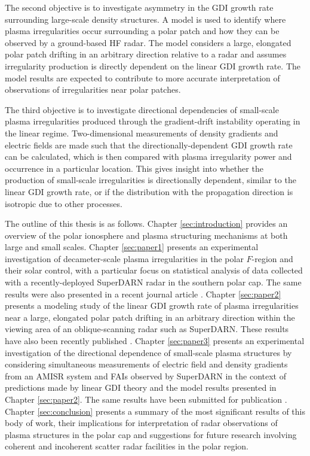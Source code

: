 The second objective is to investigate asymmetry in the GDI growth rate surrounding large-scale density structures.  A model is used to identify where plasma irregularities occur surrounding a polar patch and how they can be observed by a ground-based HF radar.  The model considers a large, elongated polar patch drifting in an arbitrary direction relative to a radar and assumes irregularity production is directly dependent on the linear GDI growth rate.  The model results are expected to contribute to more accurate interpretation of observations of irregularities near polar patches.

The third objective is to investigate directional dependencies of small-scale plasma irregularities produced through the gradient-drift instability operating in the linear regime.  Two-dimensional measurements of density gradients and electric fields are made such that the directionally-dependent GDI growth rate can be calculated, which is then compared with plasma irregularity power and occurrence in a particular location.  This gives insight into whether the production of small-scale irregularities is directionally dependent, similar to the linear GDI growth rate, or if the distribution with the propagation direction is isotropic due to other processes.

The outline of this thesis is as follows.  Chapter \ref{sec:introduction} provides an overview of the polar ionosphere and plasma structuring mechanisms at both large and small scales.  Chapter \ref{sec:paper1} presents an experimental investigation of decameter-scale plasma irregularities in the polar \(F\)-region and their solar control, with a particular focus on statistical analysis of data collected with a recently-deployed SuperDARN radar in the southern polar cap.  The same results were also presented in a recent journal article \citep{Lamarche2015}.  Chapter \ref{sec:paper2} presents a modeling study of the linear GDI growth rate of plasma irregularities near a large, elongated polar patch drifting in an arbitrary direction within the viewing area of an oblique-scanning radar such as SuperDARN.  These results have also been recently published \citep{Lamarche2016}.  Chapter \ref{sec:paper3} presents an experimental investigation of the directional dependence of small-scale plasma structures by considering simultaneous measurements of electric field and density gradients from an AMISR  system and FAIs observed by SuperDARN in the context of predictions made by linear GDI theory and the model results presented in Chapter \ref{sec:paper2}.  The same results have been submitted for publication \citep{Lamarche2017}.  Chapter \ref{sec:conclusion} presents a summary of the most significant results of this body of work, their implications for interpretation of radar observations of plasma structures in the polar cap and suggestions for future research involving coherent and incoherent scatter radar facilities in the polar region.




